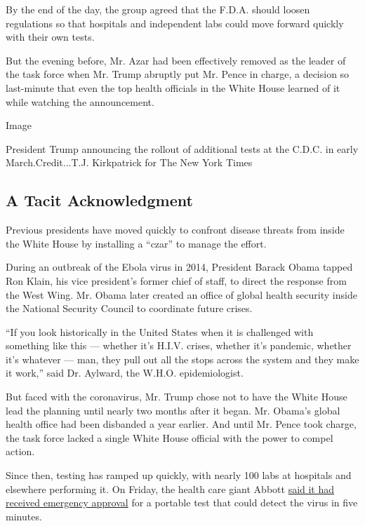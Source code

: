 By the end of the day, the group agreed that the F.D.A. should loosen
regulations so that hospitals and independent labs could move forward
quickly with their own tests.

But the evening before, Mr. Azar had been effectively removed as the
leader of the task force when Mr. Trump abruptly put Mr. Pence in
charge, a decision so last-minute that even the top health officials in
the White House learned of it while watching the announcement.

Image

President Trump announcing the rollout of additional tests at the C.D.C.
in early March.Credit...T.J. Kirkpatrick for The New York Times

\hypertarget{a-tacit-acknowledgment}{%
\subsection{A Tacit Acknowledgment}\label{a-tacit-acknowledgment}}

Previous presidents have moved quickly to confront disease threats from
inside the White House by installing a ``czar'' to manage the effort.

During an outbreak of the Ebola virus in 2014, President Barack Obama
tapped Ron Klain, his vice president's former chief of staff, to direct
the response from the West Wing. Mr. Obama later created an office of
global health security inside the National Security Council to
coordinate future crises.

``If you look historically in the United States when it is challenged
with something like this --- whether it's H.I.V. crises, whether it's
pandemic, whether it's whatever --- man, they pull out all the stops
across the system and they make it work,'' said Dr. Aylward, the W.H.O.
epidemiologist.

But faced with the coronavirus, Mr. Trump chose not to have the White
House lead the planning until nearly two months after it began. Mr.
Obama's global health office had been disbanded a year earlier. And
until Mr. Pence took charge, the task force lacked a single White House
official with the power to compel action.

Since then, testing has ramped up quickly, with nearly 100 labs at
hospitals and elsewhere performing it. On Friday, the health care giant
Abbott
\href{https://abbott.mediaroom.com/2020-03-27-Abbott-Launches-Molecular-Point-of-Care-Test-to-Detect-Novel-Coronavirus-in-as-Little-as-Five-Minutes}{said
it had received emergency approval} for a portable test that could
detect the virus in five minutes.

